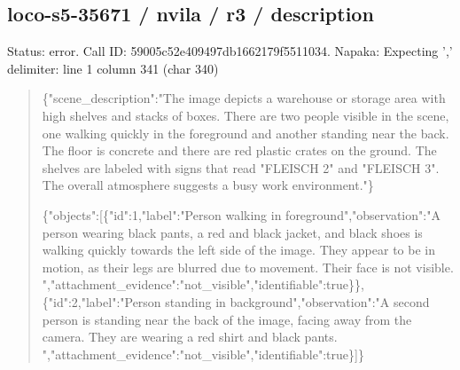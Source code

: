 \documentclass[10pt,a4paper]{article}
\begin{document}
\subsection*{loco-s5-35671 / nvila / r3 / description}
Status: error. Call ID: 59005c52e409497db1662179f5511034. Napaka: Expecting ',' delimiter: line 1 column 341 (char 340)
\begin{quote}\footnotesize
\{"scene\_description":\allowbreak{}"The image depicts a warehouse or storage area with high shelves and stacks of boxes. There are two people visible in the scene,\allowbreak{} one walking quickly in the foreground and another standing near the back. The floor is concrete and there are red plastic crates on the ground. The shelves are labeled with signs that read "FLEISCH 2" and "FLEISCH 3". The overall atmosphere suggests a busy work environment."\}\par
\par
\{"objects":\allowbreak{}[\{"id":\allowbreak{}1,\allowbreak{}"label":\allowbreak{}"Per\allowbreak{}son walking in foreground",\allowbreak{}"observation":\allowbreak{}"A person wearing black pants,\allowbreak{} a red and black jacket,\allowbreak{} and black shoes is walking quickly towards the left side of the image. They appear to be in motion,\allowbreak{} as their legs are blurred due to movement. Their face is not visible. ",\allowbreak{}"attachment\_evidence":\allowbreak{}"not\_vis\allowbreak{}ible",\allowbreak{}"identifiable":\allowbreak{}true\}\},\allowbreak{}\{"id\allowbreak{}":\allowbreak{}2,\allowbreak{}"label":\allowbreak{}"Person standing in background",\allowbreak{}"observation":\allowbreak{}"A second person is standing near the back of the image,\allowbreak{} facing away from the camera. They are wearing a red shirt and black pants. ",\allowbreak{}"attachment\_evidence":\allowbreak{}"not\_vis\allowbreak{}ible",\allowbreak{}"identifiable":\allowbreak{}true\}]\}
\end{quote}
\end{document}
